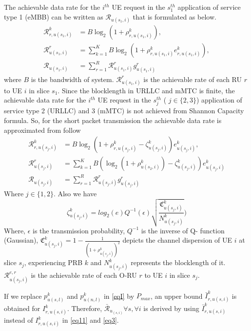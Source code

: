 \documentclass[conference]{IEEEtran}
\begin{document}
The achievable data rate for the $i^{th}$ UE request in the $s_{1}^{th}$ application of service type 1 (eMBB) can be written as $\mathcal{R}_{u(s_1,i)}$ that is formulated as below.
\begin{equation}\label{eq3}
\begin{split}
\mathcal{{R}}_{r,u(s_1,i)}^{k} &=  B \log_2({1+ \rho_{r,u(s_1,i)}^{k}}) ,\\
\mathcal{R}_{u(s_1,i)}^{r} &= \sum_{k=1}^{K} B \log_2({1+ \rho_{r,u(s_1,i)}^{k}} e^k_{r,u(s_1,i)}),\\
\mathcal{R}_{u(s_1,i)} &= \sum_{r=1}^{R}\mathcal{R}_{u(s_1,i)}^{r} g^r_{u(s_1,i)}
\end{split}
\end{equation}
where $B$ is the bandwidth of system. 
$\mathcal{R}_{u(s_1,i)}^{r}$ is the achievable rate of each RU $r$ to UE $i$ in slice $s_1$.
Since the blocklength in URLLC and mMTC is finite, the achievable data rate for the $i^{th}$ UE request in the $s_{j}^{th}$ ( $j \in \{2,3\}$) application of service type 2 (URLLC) and 3 (mMTC) is not achieved from Shannon Capacity formula. So, for the short packet transmission the achievable data rate is approximated from follow
\begin{equation}\label{eq11}
\begin{split}
\mathcal{{R}}_{r,u(s_j,i)}^{k} &= B \log_2({1+ \rho_{r,u(s_j,i)}^{k}} - \zeta_{u(s_j,i)}^{k}){e}_{u(s_j,i)}^{k},\\
\mathcal{R}_{u(s_j,i)}^{r} &= \sum_{k=1}^{K} B (\log_2({1+ \rho_{u(s_2,i)}^{k}})- \zeta_{u(s_j,i)}^{k}){e}_{u(s_j,i)}^{k}\\
\mathcal{R}_{u(s_j,i)} &= \sum_{r=1}^{R}\mathcal{R}_{u(s_j,i)}^{r} g^r_{u(s_j,i)}
\end{split}
\end{equation}
Where $j \in \{1,2\}$. Also we have
\begin{equation}\label{shortPacket}
 \zeta_{u(s_j,i)}^{k} = log_2({e})Q^{-1}(\epsilon) \sqrt{\frac{\mathfrak{C}_{u(s_j,i)}^{k}}{N_{u(s_j,i)}^{k}}})
\end{equation}
Where, $\epsilon $ is the transmission probability, $Q^{-1}$ is the inverse of Q- function (Gaussian),
$\mathfrak{C}_{u(s_j,i)}^{k} = 1 - \frac{1}{(1+\rho_{u(s_j,i)}^{k})^2}$ depicts the channel dispersion of UE  $i$ at slice $s_j$, experiencing PRB $k$ and
$N_{u(s_j,i)}^{k}$ represents the blocklength of it. 
$\mathcal{R}_{u(s_j,i)}^{e,r}$ is the achievable rate of each O-RU $r$ to UE $i$ in slice $s_j$.

If we replace $p_{u(s,l)}^{k}$ and $p_{u(n,l)}^{k}$ in \eqref{eqI} by $P_{max}$, an upper bound $\bar{I}_{r,u(s,i)}^{k}$ is obtained for $I_{r,u(s,i)}^{k}$. Therefore, $\bar{\mathcal{R}}_{u_{(s,i)}} \forall s , \forall i$ is derived by using $\bar{I}_{r,u(s,i)}^{k}$ instead of $I_{r,u(s,i)}^{k}$ in  \eqref{eq11} and \eqref{eq3}.
\end{document}
